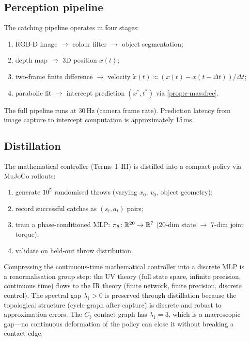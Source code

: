 \subsection{Perception pipeline}

The catching pipeline operates in four stages:
\begin{enumerate}[nosep]
  \item RGB-D image $\to$ colour filter $\to$ object
  segmentation;
  \item depth map $\to$ 3D position $x(t)$;
  \item two-frame finite difference $\to$ velocity
  $\dot{x}(t) \approx (x(t) - x(t - \Delta t))/\Delta t$;
  \item parabolic fit $\to$ intercept prediction $(x^*, t^*)$
  via \cref{prop:c-massfree}.
\end{enumerate}
The full pipeline runs at 30\,Hz (camera frame rate).
Prediction latency from image capture to intercept computation
is approximately 15\,ms.

\subsection{Distillation}

The mathematical controller (Terms~I--III) is distilled into
a compact policy via MuJoCo rollouts:
\begin{enumerate}[nosep]
  \item generate $10^5$ randomised throws (varying $x_0$, $v_0$,
  object geometry);
  \item record successful catches as $(s_t, a_t)$ pairs;
  \item train a phase-conditioned MLP:
  $\pi_\theta\colon \mathbb{R}^{20} \to \mathbb{R}^7$
  (20-dim state $\to$ 7-dim joint torque);
  \item validate on held-out throw distribution.
\end{enumerate}

\begin{remark}
Compressing the continuous-time mathematical controller into a
discrete MLP is a renormalisation group step: the UV theory (full
state space, infinite precision, continuous time) flows to the IR
theory (finite network, finite precision, discrete control).
The spectral gap $\lambda_1 > 0$ is preserved through distillation
because the topological structure (cycle graph after capture) is
discrete and robust to approximation errors.  The $C_3$ contact
graph has $\lambda_1 = 3$, which is a macroscopic gap---no
continuous deformation of the policy can close it without breaking
a contact edge.
\end{remark}


